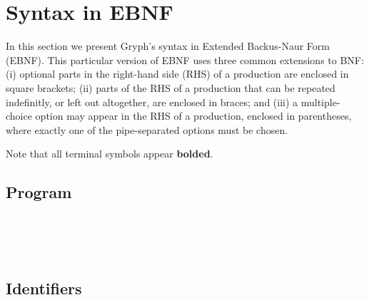 \section{Syntax in EBNF}
In this section we present Gryph's syntax in Extended Backus-Naur Form (EBNF). This particular version of EBNF uses three common extensions to BNF: (i) optional parts in the right-hand side (RHS) of a production are enclosed in square brackets; (ii) parts of the RHS of a production that can be repeated indefinitly, or left out altogether, are enclosed in braces; and (iii) a multiple-choice option may appear in the RHS of a production, enclosed in parentheses, where exactly one of the pipe-separated options must be chosen.

Note that all terminal symbols appear \textbf{bolded}.
\subsection{Program}
\begin{bnf*}
    \\
    \\
    \\
\end{bnf*}

\subsection{Identifiers}
\begin{bnf*}
    \\
    \\
    \\
    \\
    \\
    \\
    \\
    \\
\end{bnf*}

